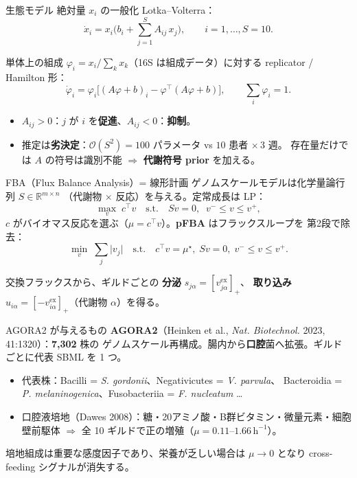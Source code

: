 \documentclass[
  ignorenonframetext,
  aspectratio=169,
]{beamer}
\providecommand{\tightlist}{%
  \setlength{\itemsep}{0pt}\setlength{\parskip}{0pt}}
\begin{document}
\begin{frame}{生態モデル}
\protect\hypertarget{ux751fux614bux30e2ux30c7ux30eb}{}
絶対量 \(x_i\) の一般化 Lotka--Volterra：
\[\dot{x}_i = x_i\Big(b_i + \sum_{j=1}^{S} A_{ij}\,x_j\Big),\qquad i=1,\dots,S=10 .\]

単体上の組成 \(\varphi_i = x_i/\sum_k x_k\)（16S は組成データ）に対する
replicator / Hamilton 形：
\[\dot{\varphi}_i = \varphi_i\Big[(A\varphi+b)_i - \varphi^{\!\top}(A\varphi+b)\Big],
\qquad \sum_i \varphi_i = 1 .\]

\begin{itemize}
\tightlist
\item
  \(A_{ij}>0\)：\(j\) が \(i\)
  を\textbf{促進}、\(A_{ij}<0\)：\textbf{抑制}。
\item
  推定は\textbf{劣決定}：\(\mathcal{O}(S^2)=100\) パラメータ vs \(10\)
  患者 \(\times\,3\) 週。 存在量だけでは \(A\) の符号は識別不能
  \(\Rightarrow\) \textbf{代謝符号 prior} を加える。
\end{itemize}
\end{frame}

\begin{frame}{FBA（Flux Balance Analysis）= 線形計画}
\protect\hypertarget{fbaflux-balance-analysis-ux7ddaux5f62ux8a08ux753b}{}
ゲノムスケールモデルは化学量論行列 \(S\in\mathbb{R}^{m\times n}\)
（代謝物 \(\times\) 反応）を与える。定常成長は LP：
\[\max_{v}\; c^{\!\top} v \quad\text{s.t.}\quad S v = 0,\;\; v^{-}\le v \le v^{+},\]
\(c\) がバイオマス反応を選ぶ（\(\mu = c^{\!\top}v\)）。\textbf{pFBA}
はフラックスループを 第2段で除去：
\[\min_{v}\; \sum_{j}\lvert v_j\rvert \quad\text{s.t.}\quad c^{\!\top}v=\mu^{\star},\; Sv=0,\; v^{-}\le v\le v^{+}.\]

交換フラックスから、ギルドごとの \textbf{分泌}
\(s_{j\alpha}=\left[v^{\text{ex}}_{j\alpha}\right]_{+}\)、
\textbf{取り込み}
\(u_{i\alpha}=\left[-v^{\text{ex}}_{i\alpha}\right]_{+}\)（代謝物
\(\alpha\)）を得る。
\end{frame}

\begin{frame}{AGORA2 が与えるもの}
\protect\hypertarget{agora2-ux304cux4e0eux3048ux308bux3082ux306e}{}
\textbf{AGORA2}（Heinken et al., \emph{Nat. Biotechnol.} 2023,
41:1320）：\textbf{7,302} 株の
ゲノムスケール再構成。腸内から\textbf{口腔}菌へ拡張。ギルドごとに代表
SBML を 1 つ。

\vspace{0.5em}
\begin{itemize}
\tightlist
\item
  代表株：Bacilli = \emph{S. gordonii}、Negativicutes = \emph{V.
  parvula}、 Bacteroidia = \emph{P. melaninogenica}、Fusobacteriia =
  \emph{F. nucleatum} \ldots{}
\item
  口腔液培地（Dawes
  2008）：糖・20アミノ酸・B群ビタミン・微量元素・細胞壁前駆体
  \(\Rightarrow\) 全 10
  ギルドで正の増殖（\(\mu = 0.11\text{–}1.66\,\mathrm{h^{-1}}\)）。
\end{itemize}

\vspace{0.5em}

培地組成は重要な感度因子であり、栄養が乏しい場合は \(\mu\to0\) となり
cross-feeding シグナルが消失する。
\end{frame}
\end{document}
